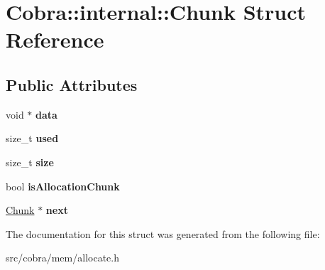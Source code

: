 \hypertarget{struct_cobra_1_1internal_1_1_chunk}{\section{Cobra\+:\+:internal\+:\+:Chunk Struct Reference}
\label{struct_cobra_1_1internal_1_1_chunk}
}
\subsection*{Public Attributes}
\begin{DoxyCompactItemize}
\item 
\hypertarget{struct_cobra_1_1internal_1_1_chunk_a5f4b15171529699db6a5a8abfd3da817}{void $\ast$ {\bfseries data}}\label{struct_cobra_1_1internal_1_1_chunk_a5f4b15171529699db6a5a8abfd3da817}

\item 
\hypertarget{struct_cobra_1_1internal_1_1_chunk_ad806a2fa9a6b154f3b80691dda0d84ec}{size\+\_\+t {\bfseries used}}\label{struct_cobra_1_1internal_1_1_chunk_ad806a2fa9a6b154f3b80691dda0d84ec}

\item 
\hypertarget{struct_cobra_1_1internal_1_1_chunk_af6305919b53009e280d6102155be824f}{size\+\_\+t {\bfseries size}}\label{struct_cobra_1_1internal_1_1_chunk_af6305919b53009e280d6102155be824f}

\item 
\hypertarget{struct_cobra_1_1internal_1_1_chunk_a3b06fa124b878e9b8ce3a6adf6398016}{bool {\bfseries is\+Allocation\+Chunk}}\label{struct_cobra_1_1internal_1_1_chunk_a3b06fa124b878e9b8ce3a6adf6398016}

\item 
\hypertarget{struct_cobra_1_1internal_1_1_chunk_a6ced34648253e2a3ad53733aea238ed0}{\hyperlink{struct_cobra_1_1internal_1_1_chunk}{Chunk} $\ast$ {\bfseries next}}\label{struct_cobra_1_1internal_1_1_chunk_a6ced34648253e2a3ad53733aea238ed0}

\end{DoxyCompactItemize}


The documentation for this struct was generated from the following file\+:\begin{DoxyCompactItemize}
\item 
src/cobra/mem/allocate.\+h\end{DoxyCompactItemize}
